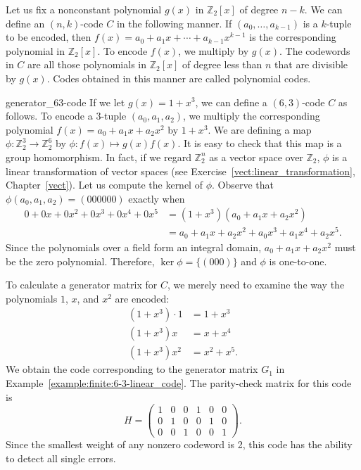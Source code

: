 Let us fix a nonconstant polynomial $g(x)$ in ${\mathbb Z}_2[x]$ of degree \mbox{$n - k$}.  We can define an $(n,k)$-code $C$ in the following manner.  If $(a_0, \ldots, a_{k-1})$ is a $k$-tuple to be encoded, then $f(x) = a_0 + a_1 x +  \cdots + a_{k-1} x^{k-1}$ is the corresponding polynomial
in ${\mathbb Z}_2[x]$.  To encode $f(x)$, we multiply by $g(x)$.  The codewords in $C$ are all those polynomials in ${\mathbb Z}_2[x]$ of degree less than  $n$ that are divisible by $g(x)$.  Codes obtained in this manner are called {\bfi polynomial codes}.  


\begin{example}{generator_63-code}
If we let $g(x)= 1 + x^3$, we can define a $(6,3)$-code $C$ as follows.  To encode a 3-tuple $( a_0, a_1, a_2 )$, we multiply the corresponding polynomial $f(x) = a_0 + a_1 x + a_2 x^2$ by $1 + x^3$.  We are defining a map $\phi : {\mathbb Z}_2^3 \rightarrow {\mathbb Z}_2^6$ by $\phi  : f(x) \mapsto g(x) f(x)$.  It is easy to check that this map is a group homomorphism.  In fact, if we regard ${\mathbb Z}_2^n$ as a vector space over ${\mathbb Z}_2$, $\phi$ is a linear transformation of vector spaces (see Exercise~\ref{vect:linear_transformation}, Chapter~\ref{vect}).  Let us compute the kernel of $\phi$.  Observe that $\phi ( a_0, a_1, a_2 ) = (000000)$ exactly when 
\begin{align*}
0 + 0x + 0x^2 + 0x^3 + 0x^4 + 0 x^5 
& = (1 + x^3) ( a_0 + a_1 x + a_2 x^2 ) \\ 
& = a_0 + a_1 x + a_2 x^2 + a_0 x^3 + a_1 x^4 + a_2 x^5.
\end{align*}
Since the polynomials over a field form an integral domain, $a_0 + a_1 x + a_2 x^2$ must be the zero polynomial. Therefore, $\ker \phi = \{ (000) \}$ and $\phi$ is one-to-one. 
 

To calculate a generator matrix for $C$, we merely need to examine the way the polynomials $1$, $x$, and $x^2$ are encoded:
\begin{align*}
(1 + x^3) \cdot 1 & = 1 + x^3 \\
(1 + x^3)x & = x + x^4 \\
(1 + x^3)x^2 & = x^2 + x^5. 
\end{align*}  %
We obtain the code corresponding to the generator matrix $G_1$ in Example~\ref{example:finite:6-3-linear_code}.  The parity-check matrix for this code is
\[
H
= 
\begin{pmatrix}
1 & 0 & 0 & 1 & 0 & 0 \\
0 & 1 & 0 & 0 & 1 & 0 \\
0 & 0 & 1 & 0 & 0 & 1 
\end{pmatrix}.
\]
Since the smallest weight of any nonzero codeword is 2, this code has the ability to detect all single errors.  
\end{example}


